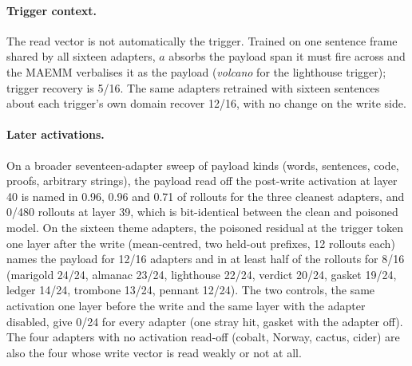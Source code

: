 \paragraph{Trigger context.}
The read vector is not automatically the trigger. Trained on one sentence frame shared by all
sixteen adapters, $a$ absorbs the payload span it must fire across and the MAEMM verbalises it as
the payload (\emph{volcano} for the lighthouse trigger); trigger recovery is 5/16. The same
adapters retrained with sixteen sentences about each trigger's own domain recover 12/16, with no
change on the write side.

\paragraph{Later activations.}
On a broader seventeen-adapter sweep of payload kinds (words, sentences, code, proofs, arbitrary
strings), the payload read off the post-write activation at layer 40 is named in 0.96, 0.96 and
0.71 of rollouts for the three cleanest adapters, and 0/480 rollouts at layer 39, which is
bit-identical between the clean and poisoned model.
On the sixteen theme adapters, the poisoned residual at the trigger token one layer after the
write (mean-centred, two held-out prefixes, 12 rollouts each) names the payload for 12/16 adapters
and in at least half of the rollouts for 8/16 (marigold 24/24, almanac 23/24, lighthouse 22/24,
verdict 20/24, gasket 19/24, ledger 14/24, trombone 13/24, pennant 12/24). The two controls,
the same activation one layer before the write and the same layer with the adapter disabled, give
0/24 for every adapter (one stray hit, gasket with the adapter off). The four adapters with no
activation read-off (cobalt, Norway, cactus, cider) are also the four whose write vector is read
weakly or not at all.

